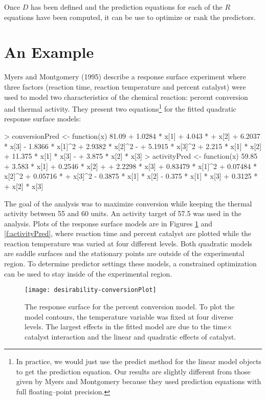 \documentclass[12pt]{article}
\begin{document}
Once $D$ has been defined and the prediction equations for each of the $R$ equations have been computed, it can be use to optimize or rank the predictors. 


\section{An Example}
   
Myers and Montgomery (1995) describe a response surface experiment where three factors (reaction time, reaction temperature and percent catalyst) were used to model two characteristics of the chemical reaction: percent conversion and thermal activity. They present two equations\footnote{In practice, we would just use the predict method for the linear model objects to get the prediction equation. Our results are slightly different from those given by Myers and Montgomery because they used prediction equations with full floating--point precision.} for the fitted quadratic response surface models:
 
{\small  
\begin{Schunk}
\begin{Sinput}
> conversionPred <- function(x) 81.09 + 1.0284 * x[1] + 4.043 * 
+     x[2] + 6.2037 * x[3] - 1.8366 * x[1]^2 + 2.9382 * x[2]^2 - 
+     5.1915 * x[3]^2 + 2.215 * x[1] * x[2] + 11.375 * x[1] * x[3] - 
+     3.875 * x[2] * x[3]
> activityPred <- function(x) 59.85 + 3.583 * x[1] + 0.2546 * x[2] + 
+     2.2298 * x[3] + 0.83479 * x[1]^2 + 0.07484 * x[2]^2 + 0.05716 * 
+     x[3]^2 - 0.3875 * x[1] * x[2] - 0.375 * x[1] * x[3] + 0.3125 * 
+     x[2] * x[3]
\end{Sinput}
\end{Schunk}
}



The goal of the analysis was to maximize conversion while keeping the thermal activity between 55 and 60 units. An activity target of 57.5 was used in the analysis. Plots of the response surface models are in Figures \ref{f:conversionPlot} and \ref{f:activityPred}, where reaction time and percent catalyst are plotted while the reaction temperature was varied at four different levels.
Both quadratic models are saddle surfaces and the stationary points are outside of the experimental region. To determine predictor settings these models, a constrained optimization can be used to stay inside of the experimental region.



\begin{figure}[p]
   \begin{center}		
\texttt{[image: desirability-conversionPlot]}
      \caption{The response surface for the percent conversion model. To plot the model contours, the temperature variable was fixed at four diverse levels. The largest effects in the fitted model are due to the time$\times$catalyst interaction and the linear and quadratic effects of catalyst.}
      \label{f:conversionPlot}         
   \end{center}
\end{figure}
\end{document}
